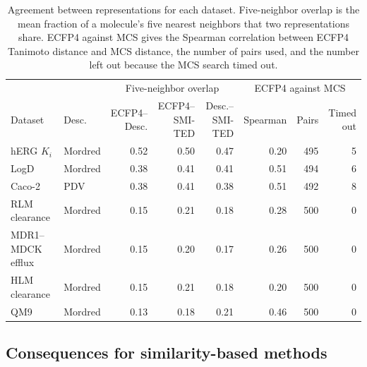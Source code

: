 \begin{table}[t]
\centering
\small
\setlength{\tabcolsep}{4pt}
\begin{adjustbox}{max width=\textwidth,max totalheight=0.78\textheight}
\begin{tabular}{llrrrrrr}
\toprule
 & & \multicolumn{3}{c}{Five-neighbor overlap} & \multicolumn{3}{c}{ECFP4 against MCS} \\
\cmidrule(lr){3-5}\cmidrule(lr){6-8}
Dataset & Desc. & \makecell{ECFP4--\\Desc.} & \makecell{ECFP4--\\SMI-TED} & \makecell{Desc.--\\SMI-TED} & Spearman & Pairs & \makecell{Timed\\out} \\
\midrule
hERG $K_i$ & Mordred & 0.52 & 0.50 & 0.47 & 0.20 & 495 & 5 \\
LogD & Mordred & 0.38 & 0.41 & 0.41 & 0.51 & 494 & 6 \\
Caco-2 & PDV & 0.38 & 0.41 & 0.38 & 0.51 & 492 & 8 \\
RLM clearance & Mordred & 0.15 & 0.21 & 0.18 & 0.28 & 500 & 0 \\
MDR1--MDCK efflux & Mordred & 0.15 & 0.20 & 0.17 & 0.26 & 500 & 0 \\
HLM clearance & Mordred & 0.15 & 0.21 & 0.18 & 0.20 & 500 & 0 \\
QM9 & Mordred & 0.13 & 0.18 & 0.21 & 0.46 & 500 & 0 \\
\bottomrule
\end{tabular}
\end{adjustbox}
\caption[Agreement between representations per dataset.]{Agreement between representations for each dataset. Five-neighbor overlap is the mean fraction of a molecule's five nearest neighbors that two representations share. ECFP4 against MCS gives the Spearman correlation between ECFP4 Tanimoto distance and MCS distance, the number of pairs used, and the number left out because the MCS search timed out.}
\label{tab:flaws:neighbor_overlap}
\end{table}

\subsection{Consequences for similarity-based methods}\label{sec:flaws:consequences}

